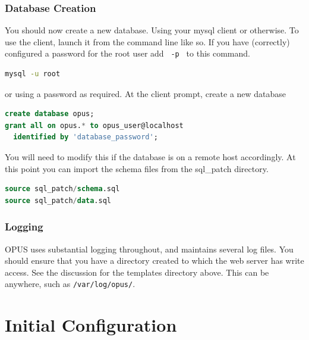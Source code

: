 \documentclass[12 pt]{book}
\begin{document}

\subsection{Database Creation}

You should now create a new database. Using your mysql client or otherwise. To use the client, launch it from the
command line like so. If you have (correctly) configured a password for the root user add \lstinline! -p ! to this command.
\begin{lstlisting}[language=bash]
mysql -u root
\end{lstlisting}
or using a password as required. At the client prompt, create a new database
\begin{lstlisting}[language=SQL]
create database opus;
grant all on opus.* to opus_user@localhost
  identified by 'database_password';
\end{lstlisting}

You will need to modify this if the database is on a remote host accordingly. At this point
you can import the schema files from the sql\_patch directory.
\begin{lstlisting}[language=SQL]
source sql_patch/schema.sql
source sql_patch/data.sql
\end{lstlisting}

\subsection{Logging}

OPUS uses substantial logging throughout, and maintains several log files. You should ensure that you have a directory created to which
the web server has write access. See the discussion for the templates directory above. This can be anywhere, such as \lstinline!/var/log/opus/!.

\chapter{Initial Configuration}
\end{document}
